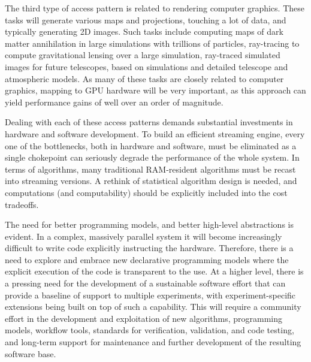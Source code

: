 The third type of access pattern is related to rendering computer
graphics. These tasks will generate various maps and projections,
touching a lot of data, and typically generating 2D images. Such tasks
include computing maps of dark matter annihilation in large
simulations with trillions of particles, ray-tracing to compute
gravitational lensing over a large simulation, ray-traced simulated
images for future telescopes, based on simulations and detailed
telescope and atmospheric models. As many of these tasks are closely
related to computer graphics, mapping to GPU hardware will be very
important, as this approach can yield performance gains of well over
an order of magnitude.


Dealing with each of these access patterns demands substantial
investments in hardware and software development. To build an
efficient streaming engine, every one of the bottlenecks, both in
hardware and software, must be eliminated as a single chokepoint can
seriously degrade the performance of the whole system. In terms of
algorithms, many traditional RAM-resident algorithms must be recast
into streaming versions. A rethink of statistical algorithm design is
needed, and computations (and computability) should be explicitly
included into the cost tradeoffs.

The need for better programming models, and better high-level
abstractions is evident. In a complex, massively parallel system it
will become increasingly difficult to write code explicitly
instructing the hardware. Therefore, there is a need to explore and
embrace new declarative programming models where the explicit
execution of the code is transparent to the use. At a higher level,
there is a pressing need for the development of a sustainable software
effort that can provide a baseline of support to multiple experiments,
with experiment-specific extensions being built on top of such a
capability. This will require a community effort in the development
and exploitation of new algorithms, programming models, workflow
tools, standards for verification, validation, and code testing, and
long-term support for maintenance and further development of the
resulting software base.

